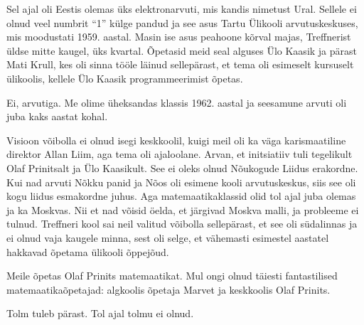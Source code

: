 Sel ajal oli Eestis olemas üks elektronarvuti, mis kandis 
nimetust Ural. Sellele ei olnud veel numbrit \enquote{1} külge 
pandud ja see asus Tartu Ülikooli arvutuskeskuses, mis moodustati 1959. aastal. Masin ise asus peahoone 
kõrval majas, Treffnerist üldse mitte kaugel, üks kvartal. 
Õpetasid meid seal alguses Ülo Kaasik ja pärast Mati 
Krull, kes oli sinna tööle läinud sellepärast, 
et tema oli esimeselt kursuselt ülikoolis, kellele Ülo Kaasik programmeerimist õpetas. 


Ei, arvutiga. Me olime üheksandas klassis 1962. aastal ja 
seesamune arvuti oli juba kaks aastat kohal. 


Visioon võibolla ei olnud isegi keskkoolil, kuigi meil 
oli ka väga karismaatiline direktor Allan Liim, aga tema oli ajaloolane. Arvan, et initsiatiiv tuli tegelikult 
Olaf Prinitsalt ja Ülo Kaasikult. See ei oleks olnud Nõukogude Liidus erakordne. Kui nad arvuti 
Nõkku panid ja Nõos oli esimene kooli arvutuskeskus, siis 
see oli kogu liidus esmakordne juhus. Aga matemaatikaklassid olid tol ajal juba 
olemas ja ka Moskvas. Nii et nad võisid öelda, et järgivad 
Moskva malli, ja probleeme ei tulnud. Treffneri kool sai neil valitud võibolla sellepärast, et see oli südalinnas ja 
ei olnud vaja kaugele minna, sest oli selge, et vähemasti esimestel 
aastatel hakkavad õpetama ülikooli õppejõud. 

Meile õpetas Olaf Prinits 
matemaatikat. Mul ongi olnud täiesti fantastilised 
matemaatikaõpetajad: algkoolis õpetaja Marvet ja keskkoolis Olaf 
Prinits. 


Tolm tuleb pärast. Tol ajal tolmu ei olnud. 

